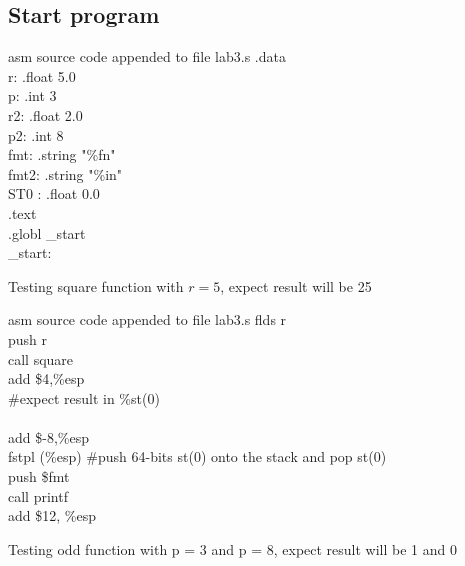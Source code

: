 \documentclass{article}
\begin{document}
\subsection{Start program}
\begin{GFT}{asm source code appended to file lab3.s}
\+.data\\
\+r: .float 5.0\\
\+p:  .int 3\\
\+r2: .float 2.0\\
\+p2: .int 8\\
\+fmt: .string "\%f\Backslash{}n"\\
\+fmt2: .string "\%i\Backslash{}n"\\
\+ST0 : .float 0.0\\
\+.text\\
\+.globl \_start\\
\+\_start:\\
\end{GFT}
Testing square function with $r = 5$, expect result will be 25
\begin{GFT}{asm source code appended to file lab3.s}
\+  flds r\\
\+  push r\\
\+  call square\\
\+  add \$4,\%esp\\
\+  \#expect result in \%st(0)\\
\+\\
\+  add \$-8,\%esp \\
\+  fstpl (\%esp) \#push 64-bits st(0) onto the stack and pop st(0)\\
\+  push \$fmt\\
\+  call printf\\
\+  add \$12, \%esp\\
\end{GFT}
Testing odd function with p = 3 and p = 8, expect result will be 1 and 0
\end{document}
